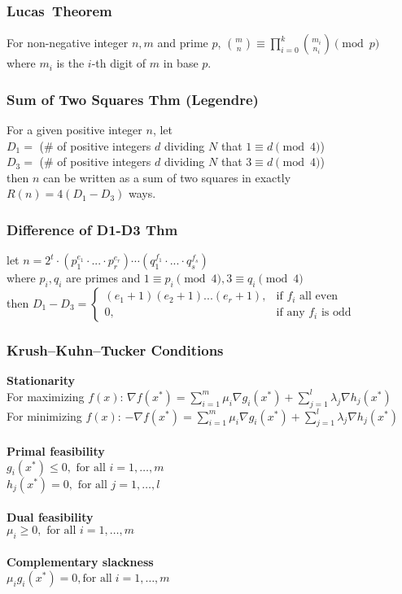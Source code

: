 \subsubsection{Lucas\textquotesingle \ Theorem}
	For non-negative integer $n,m$ and prime $p$, $\binom{m}{n}\equiv\prod_{i=0}^k\binom{m_i}{n_i}\pmod p$\\
	where $m_i$ is the $i$-th digit of $m$ in base $p$.
\subsubsection{Sum of Two Squares Thm (Legendre)}
	For a given positive integer $n$, let\\
	$D_1 =$ (\# of positive integers $d$ dividing $N$ that $1\equiv d\pmod 4$)\\
	$D_3 =$ (\# of positive integers $d$ dividing $N$ that $3\equiv d\pmod 4$)\\
	then $n$ can be written as a sum of two squares in exactly\\
	$R(n) = 4(D_1-D_3)$ ways.
\subsubsection{Difference of D1-D3 Thm}
	let $n = 2^t \cdot (p_1^{e_1} \cdot ... \cdot p_r^{e_r}) \cdots (q_1^{f_1} \cdot ... \cdot q_s^{f_s})$\\
	where $p_i, q_i$ are primes and $1 \equiv p_i\pmod 4 , 3 \equiv q_i\pmod 4$\\
	then
	$ D_1 - D_3 = \begin{cases}
	(e_1+1)(e_2+1)...(e_r+1), & \text{if }f_i\text{ all even}\\
	0, & \text{if any }f_i \text{ is odd}
	\end{cases} $
\subsubsection{Krush–Kuhn–Tucker Conditions}
	\textbf{Stationarity}\\
	For maximizing $f(x)$: $\nabla f(x^*) = \sum_{i=1}^m \mu_i \nabla g_i(x^*) + \sum_{j=1}^l \lambda_j \nabla h_j(x^*)$\\
	For minimizing $f(x)$: $-\nabla f(x^*) = \sum_{i=1}^m \mu_i \nabla g_i(x^*) + \sum_{j=1}^l \lambda_j \nabla h_j(x^*)$ \\
\\
	\textbf{Primal feasibility}\\
	$g_i(x^*) \le 0, \mbox{ for all } i = 1, \ldots, m$\\
	$h_j(x^*) = 0, \mbox{ for all } j = 1, \ldots, l \,\!$\\
\\
	\textbf{Dual feasibility}\\
	$\mu_i \ge 0, \mbox{ for all } i = 1, \ldots, m$\\
\\
	\textbf{Complementary slackness}\\
	$\mu_i g_i (x^*) = 0, \mbox{for all}\; i = 1,\ldots,m$
